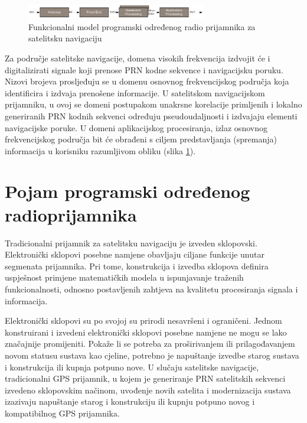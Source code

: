 \documentclass[a4paper,twoside,12pt]{memoir} %
\begin{document}
\begin{figure}[H]
	\centering
	\includegraphics[width=0.7\textwidth]{modelPOR}
	\caption{Funkcionalni model programski određenog radio prijamnika za satelitsku navigaciju}
	\label{Fig:modelPOR}	
\end{figure}

Za područje satelitske navigacije, domena visokih frekvencija izdvojit će i digitalizirati signale koji prenose PRN kodne sekvence i navigacijsku poruku. Nizovi brojeva prosljeđuju se u domenu osnovnog frekvencijskog područja koja identificira i izdvaja prenošene informacije. U satelitskom navigacijskom prijamniku, u ovoj se domeni postupakom unakrsne korelacije primljenih i lokalno generiranih PRN kodnih sekvenci određuju pseudoudaljnosti i izdvajaju elementi navigacijske poruke. U domeni aplikacijskog procesiranja, izlaz osnovnog frekvencijskog područja bit će obrađeni s ciljem predstavljanja (spremanja) informacija u korisniku razumljivom obliku (slika \ref{Fig:modelPOR}).

\section{Pojam programski određenog radioprijamnika}
Tradicionalni prijamnik za satelitsku navigaciju je izveden sklopovski. Elektronički sklopovi posebne namjene obavljaju ciljane funkcije unutar segmenata prijamnika. Pri tome, konstrukcija i izvedba sklopova definira uspješnost primjene matematičkih modela u ispunjavanje traženih funkcionalnosti, odnosno postavljenih zahtjeva na kvalitetu procesiranja signala i informacija.

Elektronički sklopovi su po svojoj su prirodi nesavršeni i ograničeni. Jednom konstruirani i izvedeni elektronički sklopovi posebne namjene ne mogu se lako značajnije promijeniti. Pokaže li se potreba za proširivanjem ili prilagođavanjem novom statusu sustava kao cjeline,
potrebno je napuštanje izvedbe starog sustava i konstrukcija ili kupnja potpuno nove.
U slučaju satelitske navigacije, tradicionalni GPS prijamnik, u kojem je generiranje PRN satelitskih sekvenci izvedeno sklopovskim načinom, uvođenje novih satelita i modernizacija sustava izazivaju napuštanje starog i konstrukciju ili kupnju potpuno novog i kompatibilnog GPS prijamnika.
\end{document}
